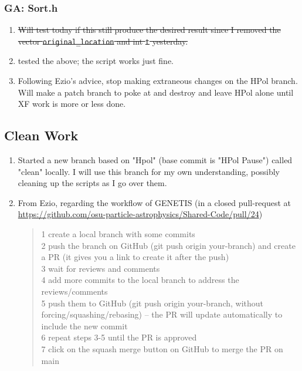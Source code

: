 \documentclass[12pt,letterpaper]{article}
\begin{document}
\subsubsection{GA: Sort.h}
\begin{enumerate}
  \item \st{Will test today if this still produce the desired result since I removed
    the vector \texttt{original\_location} and int \texttt{t} yesterday.}
  \item tested the above; the script works just fine.
  \item Following Ezio's advice, stop making extraneous changes on the HPol branch.
    Will make a patch branch to poke at and destroy and leave HPol alone until XF 
    work is more or less done.
\end{enumerate}
\subsection{Clean Work}
\begin{enumerate}
  \item Started a new branch based on "Hpol" (base commit is "HPol Pause") called
    "clean" locally. I will use this branch for my own understanding, possibly cleaning
    up the scripts as I go over them.
  \item From Ezio, regarding the workflow of GENETIS (in a closed pull-request at
    \url{https://github.com/osu-particle-astrophysics/Shared-Code/pull/24})
    \begin{quote}
   1 create a local branch with some commits\\
   2 push the branch on GitHub (git push origin your-branch) and create a PR
   (it gives you a link to create it after the push)\\
   3 wait for reviews and comments\\
   4 add more commits to the local branch to address the reviews/comments\\
   5 push them to GitHub (git push origin your-branch, without
   forcing/squashing/rebasing) -- the PR will update automatically to include
   the new commit\\
   6 repeat steps 3-5 until the PR is approved\\
   7 click on the squash merge button on GitHub to merge the PR on main\\
    \end{quote}
    
\end{enumerate}
\end{document}
